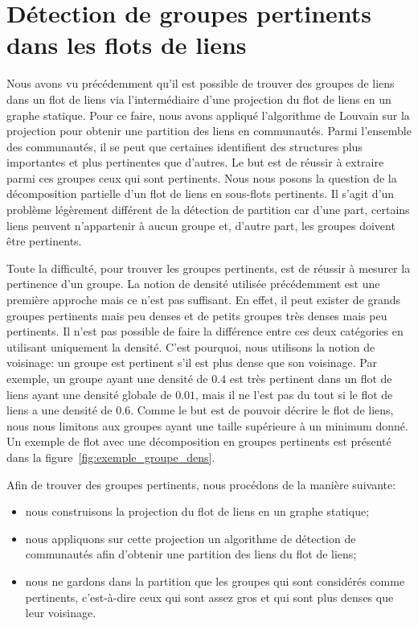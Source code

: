 \chapter{Détection de groupes pertinents dans les flots de liens}
\minitoc

\label{groupesDense}
Nous avons vu précédemment qu'il est possible de trouver des groupes de liens dans un flot de liens via l'intermédiaire d'une projection du flot de liens en un graphe statique.
Pour ce faire, nous avons appliqué l'algorithme de Louvain sur la projection pour obtenir une partition des liens en communautés.
Parmi l'ensemble des communautés, il se peut que certaines identifient des structures plus importantes et plus pertinentes que d'autres.
Le but est de réussir à extraire parmi ces groupes ceux qui sont pertinents.
Nous nous posons la question de la décomposition partielle d'un flot de liens en sous-flots pertinents.
Il s'agit d'un problème légèrement différent de la détection de partition car d'une part, certains liens peuvent n'appartenir à aucun groupe et, d'autre part, les groupes doivent être pertinents.

Toute la difficulté, pour trouver les groupes pertinents, est de réussir à mesurer la pertinence d'un groupe.
La notion de densité utilisée précédemment est une première approche mais ce n'est pas suffisant.
En effet, il peut exister de grands groupes pertinents mais peu denses et de petits groupes très denses mais peu pertinents.
Il n'est pas possible de faire la différence entre ces deux catégories en utilisant uniquement la densité.
C'est pourquoi, nous utilisons la notion de voisinage: un groupe est pertinent s'il est plus dense que son voisinage.
Par exemple, un groupe ayant une densité de $0.4$ est très pertinent dans un flot de liens ayant une densité globale de $0.01$, mais il ne l'est pas du tout si le flot de liens a une densité de $0.6$.
Comme le but est de pouvoir décrire le flot de liens, nous nous limitons aux groupes ayant une taille supérieure à un minimum donné.
Un exemple de flot avec une décomposition en groupes pertinents est présenté dans la figure~\ref{fig:exemple_groupe_dens}.

Afin de trouver des groupes pertinents, nous procédons de la manière suivante:
\begin{itemize}
\item nous construisons la projection du flot de liens en un graphe statique;
\item nous appliquons sur cette projection un algorithme de détection de communautés afin d'obtenir une partition des liens du flot de liens;
\item nous ne gardons dans la partition que les groupes qui sont considérés comme pertinents, c'est-à-dire ceux qui sont assez gros et qui sont plus denses que leur voisinage.
\end{itemize}

